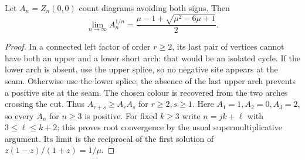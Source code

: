 \begin{corollary}\label{cor:double}
Let \(A_n=Z_n(0,0)\) count diagrams avoiding both signs. Then
\[
 \lim_{n\to\infty} A_n^{1/n}
       = \frac{\mu-1+\sqrt{\mu^2-6\mu+1}}{2}.
\]
\end{corollary}
\begin{proof}
In a connected left factor of order \(r\ge2\), its last pair of
vertices cannot have both an upper and a lower short arch: that would
be an isolated cycle. If the lower arch is absent, use the upper
splice, so no negative site appears at the seam. Otherwise use the
lower splice; the absence of the last upper arch prevents a positive
site at the seam. The chosen colour is recovered from the two arches
crossing the cut. Thus \(A_{r+s}\ge A_r A_s\) for \(r\ge2,s\ge1\).
Here \(A_1=1,A_2=0,A_3=2\), so every \(A_n\) for \(n\ge3\) is
positive. For fixed \(k\ge3\) write \(n=jk+\ell\) with
\(3\le\ell\le k+2\); this proves root convergence by the usual
supermultiplicative argument. Its limit is the reciprocal of the
first solution of \(z(1-z)/(1+z)=1/\mu\).
\end{proof}
